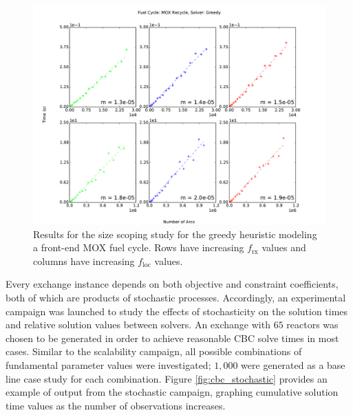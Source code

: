 \documentclass{anstrans}
\newcommand{\frx}{$f_{\text{rx}}$\xspace}
\newcommand{\floc}{$f_{\text{loc}}$\xspace}
\begin{document}
\begin{figure}
  \begin{center}
    \includegraphics[width=1.5\columnwidth]{base_front_n_arcs_time_fc1_greedy.pdf}
    \caption[]{
      \label{fig:greedy_size}
      Results for the size scoping study for the greedy heuristic modeling a
      front-end MOX fuel cycle. Rows have increasing \frx values and columns have
      increasing \floc values.}
  \end{center}
\end{figure}

Every exchange instance depends on both objective and constraint coefficients,
both of which are products of stochastic processes. Accordingly, an experimental
campaign was launched to study the effects of stochasticity on the solution
times and relative solution values between solvers. An exchange with $65$
reactors was chosen to be generated in order to achieve reasonable CBC solve
times in most cases. Similar to the scalability campaign, all possible
combinations of fundamental parameter values were investigated; $1,000$ were
generated as a base line case study for each combination. Figure
\ref{fig:cbc_stochastic} provides an example of output from the stochastic
campaign, graphing cumulative solution time values as the number of observations
increases.
\end{document}
